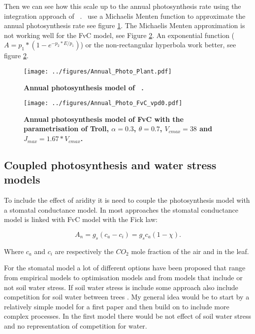 \documentclass[a4paper,11pt]{article}
\begin{document}
Then we can see how this scale up to the annual photosynthesis rate using the integration approach of \plant\ . \plant\ use a Michaelis Menten function to approximate the annual photosynthesis rate see figure \ref{fig:photo_annu_plant}. The Michaelis Menten approximation is not working well for the FvC model, see Figure \ref{fig:photo_annu_fvc}. An exponential function \citep{Chen-2016} ($A = p_1 *(1-e^{-p_2* E/p_1})$) or the non-rectangular hyperbola work better, see figure \ref{fig:photo_annu_fvc}.


\begin{figure}[ht]
\centering
\texttt{[image: ../figures/Annual\_Photo\_Plant.pdf]}
\caption{\textbf{Annual photosynthesis model of \plant\ .}
\label{fig:photo_annu_plant}}
\end{figure}


\begin{figure}[ht]
\centering
\texttt{[image: ../figures/Annual\_Photo\_FvC\_vpd0.pdf]}
\caption{\textbf{Annual photosynthesis model of FvC with the parametrisation of Troll, $\alpha = 0.3$, $\theta = 0.7$, $V_{cmax} = 38$ and $J_{max} = 1.67 * V_{cmax}$.}
\label{fig:photo_annu_fvc}}
\end{figure}

\clearpage

\subsection{Coupled photosynthesis and water stress models}

To include the effect of aridity it is need to couple the photosynthesis model with a stomatal conductance model. In most approaches the stomatal conductance model is linked with FvC model with the Fick law:

\begin{equation}
\label{eq:fick}
A_n = g_s (c_a - c_i) = g_s c_a (1-\chi).
\end{equation}

Where $c_a$ and $c_i$ are respectively the $CO_2$ mole fraction of the air and in the leaf.


For the stomatal model a lot of different options have been proposed that range from empirical models to optimisation models and from models that include or not soil water stress. If soil water stress is include some approach also include competition for soil water between trees \citep{Farrior-2013}. My general idea would be to start by a relatively simple model for a first paper and then build on to include more complex processes. In the first model there would be not effect of soil water stress and no representation of competition for water.
\end{document}
